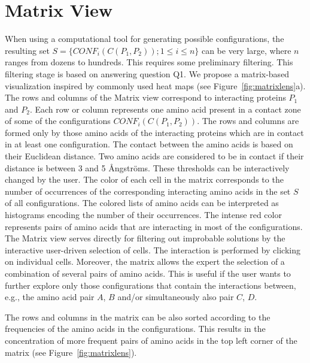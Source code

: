 \documentclass{bmcart}
\def\MatView {Matrix view\xspace}
\begin{document}

\section{Matrix View}
\label{sec:matview}
When using a computational tool for generating possible configurations, the resulting set $S = \{CONF_i(C(P_1,P_2)); 1 \leq i \leq n\}$ can be very large, where $n$ ranges from dozens to hundreds. 
This requires some preliminary filtering.
This filtering stage is based on answering question Q1.
We propose a matrix-based visualization inspired by commonly used heat maps (see Figure~\ref{fig:matrixlens}a).
The rows and columns of the \MatView correspond to interacting proteins $P_1$ and $P_2$.
Each row or column represents one amino acid present in a contact zone of some of the configurations $CONF_i(C(P_1,P_2))$. 
The rows and columns are formed only by those amino acids of the interacting proteins which are in contact in at least one configuration.
The contact between the amino acids is based on their Euclidean distance. 
Two amino acids are considered to be in contact if their distance is between 3 and 5 \AA ngstr\"{o}ms.
These thresholds can be interactively changed by the user.
The color of each cell in the matrix corresponds to the number of occurrences of the corresponding interacting amino acids in the set $S$ of all configurations. 
The colored lists of amino acids can be interpreted as histograms encoding the number of their occurrences.
The intense red color represents pairs of amino acids that are interacting in most of the configurations.
The \MatView serves directly for filtering out improbable solutions by the interactive user-driven selection of cells.
The interaction is performed by clicking on individual cells. 
Moreover, the matrix allows the expert the selection of a combination of several pairs of amino acids.
This is useful if the user wants to further explore only those configurations that contain the interactions between, e.g., the amino acid pair $A$, $B$ and/or simultaneously also pair $C$, $D$. 

The rows and columns in the matrix can be also sorted according to the frequencies of the amino acids in the configurations. 
This results in the concentration of more frequent pairs of amino acids in the top left corner of the matrix (see Figure~\ref{fig:matrixlens}).
\end{document}
